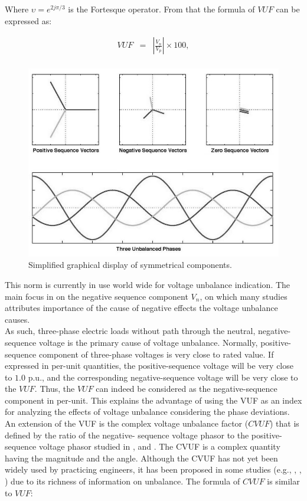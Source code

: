 	Where $\upsilon=e^{2j\pi/3}$ is the Fortesque operator. From that the formula of $VUF$ can be expressed as:
	
	
	\begin{equation}
        \begin{array}{rcl}
            VUF&=&\left|\frac{V_n}{V_p}\right|\times100,\\					
        \end{array}
        \label{BASICUNB:equ:VUF}
    \end{equation}

    \begin{figure}[h]
         \centering
         \includegraphics[width=.7\textwidth]{Unblance_EPS_Pics/Symmetrical_components_gray.jpg}
         \caption{Simplified graphical display of symmetrical components.}
         \label{BASICUNB:fig:symmetrical_simple}
     \end{figure}
	
This norm is currently in use world wide for voltage unbalance indication. The main focus in on the negative sequence component $V_n$, on which many studies attributes importance of the cause of negative effects the voltage unbalance causes.\\
	As such, three-phase electric loads without path through the neutral, negative-sequence voltage is the primary cause of voltage unbalance. Normally, positive-sequence component of three-phase voltages is very close to rated value. If expressed in per-unit quantities, the positive-sequence voltage will be very close to $1.0$ p.u., and the corresponding negative-sequence voltage will be very close to the $VUF$. Thus, the $VUF$ can indeed be considered as the negative-sequence component in per-unit.	This explains the advantage of using the VUF as an index for analyzing the effects of voltage unbalance considering the phase deviations.
	An extension of the VUF is the complex voltage unbalance factor ($CVUF$) that is defined by the ratio of the negative-
sequence voltage phasor to the positive-sequence voltage phasor studied in \cite{wang2000analytical}, and \cite{pierrat1987unbalance}. The CVUF is a complex quantity having the magnitude and the angle. Although the CVUF has not yet been widely used by practicing engineers, it has been proposed in some studies (e.g., \cite{wang2001analysis}, \cite{singh2007some}, \cite{chen2013examination}) due to its richness of information on unbalance. The formula of $CVUF$ is similar to $VUF$:

